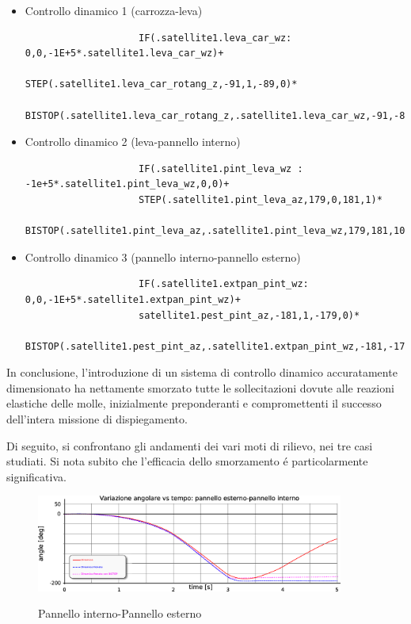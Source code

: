 \documentclass{article}
\begin{document}
        \begin{itemize}
            \item Controllo dinamico 1 (carrozza-leva) 
                \begin{lstlisting}
                    IF(.satellite1.leva_car_wz: 0,0,-1E+5*.satellite1.leva_car_wz)+
                    STEP(.satellite1.leva_car_rotang_z,-91,1,-89,0)*
                    BISTOP(.satellite1.leva_car_rotang_z,.satellite1.leva_car_wz,-91,-89,10000,2.2,100,0.1)
                \end{lstlisting}
            \item Controllo dinamico 2 (leva-pannello interno) 
                \begin{lstlisting}
                    IF(.satellite1.pint_leva_wz : -1e+5*.satellite1.pint_leva_wz,0,0)+
                    STEP(.satellite1.pint_leva_az,179,0,181,1)*
                    BISTOP(.satellite1.pint_leva_az,.satellite1.pint_leva_wz,179,181,10000,2.2,100,0.1)
                \end{lstlisting}
            \item Controllo dinamico 3 (pannello interno-pannello esterno)  
                \begin{lstlisting}
                    IF(.satellite1.extpan_pint_wz: 0,0,-1E+5*.satellite1.extpan_pint_wz)+
                    satellite1.pest_pint_az,-181,1,-179,0)*
                    BISTOP(.satellite1.pest_pint_az,.satellite1.extpan_pint_wz,-181,-179,10000,2.2,100,0.1)
                \end{lstlisting}
        \end{itemize}

        \clearpage

        In conclusione, l'introduzione di un sistema di controllo dinamico accuratamente dimensionato 
        ha nettamente smorzato tutte le sollecitazioni dovute alle reazioni elastiche delle molle, inizialmente
        preponderanti e compromettenti il successo dell'intera missione di dispiegamento. 

        Di seguito, si confrontano gli andamenti dei vari moti di rilievo, nei tre casi studiati.
        Si nota subito che l'efficacia dello smorzamento é particolarmente significativa.

            \begin{figure}[h!]
                 \label{fig:dinamica_confronto_pannelli}
                \centering
                \includegraphics[width=0.9\textwidth]{MUL2/Esercitazione4/dinamica_confronto_pannelli.eps} 
                \caption{Pannello interno-Pannello esterno}
            \end{figure}
\end{document}

